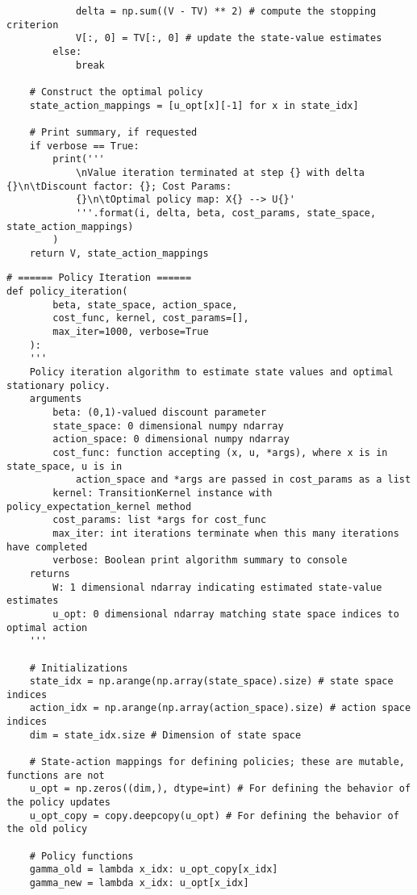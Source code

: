 \documentclass[10pt]{article}
\newcommand{\1}[1]{\mathbbm{1}_{#1}}
\begin{document}
\begin{verbatim}
            delta = np.sum((V - TV) ** 2) # compute the stopping criterion
            V[:, 0] = TV[:, 0] # update the state-value estimates
        else:
            break
    
    # Construct the optimal policy
    state_action_mappings = [u_opt[x][-1] for x in state_idx]

    # Print summary, if requested
    if verbose == True:
        print('''
            \nValue iteration terminated at step {} with delta {}\n\tDiscount factor: {}; Cost Params:
            {}\n\tOptimal policy map: X{} --> U{}'
            '''.format(i, delta, beta, cost_params, state_space, state_action_mappings)
        )
    return V, state_action_mappings
    \end{verbatim}
    \begin{verbatim}
# ====== Policy Iteration ======
def policy_iteration(
        beta, state_space, action_space,
        cost_func, kernel, cost_params=[],
        max_iter=1000, verbose=True
    ):
    '''
    Policy iteration algorithm to estimate state values and optimal stationary policy.
    arguments
        beta: (0,1)-valued discount parameter
        state_space: 0 dimensional numpy ndarray
        action_space: 0 dimensional numpy ndarray
        cost_func: function accepting (x, u, *args), where x is in state_space, u is in
            action_space and *args are passed in cost_params as a list
        kernel: TransitionKernel instance with policy_expectation_kernel method
        cost_params: list *args for cost_func
        max_iter: int iterations terminate when this many iterations have completed
        verbose: Boolean print algorithm summary to console
    returns
        W: 1 dimensional ndarray indicating estimated state-value estimates
        u_opt: 0 dimensional ndarray matching state space indices to optimal action
    '''

    # Initializations
    state_idx = np.arange(np.array(state_space).size) # state space indices
    action_idx = np.arange(np.array(action_space).size) # action space indices
    dim = state_idx.size # Dimension of state space

    # State-action mappings for defining policies; these are mutable, functions are not
    u_opt = np.zeros((dim,), dtype=int) # For defining the behavior of the policy updates
    u_opt_copy = copy.deepcopy(u_opt) # For defining the behavior of the old policy

    # Policy functions
    gamma_old = lambda x_idx: u_opt_copy[x_idx]
    gamma_new = lambda x_idx: u_opt[x_idx]
    

\end{verbatim}
\end{document}
